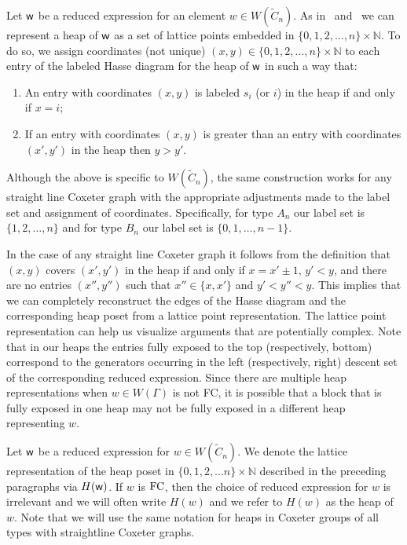 Let $\mathsf{w}$ be a reduced expression for an element $w \in W(\widetilde{C}_n)$. As in~\cite{Billey2007} and~\cite{Ernst2010} we can represent a heap of $\mathsf{w}$ as a set of lattice points embedded in $\{0,1,2,\ldots, n\} \times \mathbb{N}$. To do so, we assign coordinates (not unique) $(x,y) \in \{0,1,2,\ldots, n\} \times \mathbb{N}$ to each entry of the labeled Hasse diagram for the heap of $\mathsf{w}$ in such a way that:
\begin{enumerate}[leftmargin=2cm]
\item An entry with coordinates $(x,y)$ is labeled $s_i$ (or $i$) in the heap if and only if $x = i$; 

\item If an entry with coordinates $(x,y)$ is greater than an entry with coordinates $(x',y')$ in the heap then $y > y'$.
\end{enumerate}

Although the above is specific to $W(\widetilde{C}_n)$, the same construction works for any straight line Coxeter graph with the appropriate adjustments made to the label set and assignment of coordinates. Specifically, for type $A_n$ our label set is $\{1,2, \ldots, n\}$ and for type $B_n$ our label set is $\{0,1, \ldots, n-1\}$.

In the case of any straight line Coxeter graph it follows from the definition that $(x,y)$ covers $(x',y')$ in the heap if and only if $x = x' \pm 1$, $y'< y$, and there are no entries $(x'', y'')$ such that $x'' \in \{x, x'\}$ and $y'< y'' < y$. This implies that we can completely reconstruct the edges of the Hasse diagram and the corresponding heap poset from a lattice point representation. The lattice point representation can help us visualize arguments that are potentially complex. Note that in our heaps the entries fully exposed to the top (respectively, bottom) correspond to the generators occurring in the left (respectively, right) descent set of the corresponding reduced expression. Since there are multiple heap representations when $w \in W(\Gamma)$ is not FC, it is possible that a block that is fully exposed in one heap may not be fully exposed in a different heap representing $w$.

Let $\mathsf{w}$ be a reduced expression for $w \in W(\widetilde{C}_n)$. We denote the lattice representation of the heap poset in $\{0,1,2, \ldots n\} \times \mathbb{N}$ described in the preceding paragraphs via $H(\mathsf{w})$. If $w$ is $\mathrm{FC}$, then the choice of reduced expression for $w$ is irrelevant and we will often write $H(w)$ and we refer to $H(w)$ as the heap of $w$. Note that we will use the same notation for heaps in Coxeter groups of all types with straightline Coxeter graphs.

